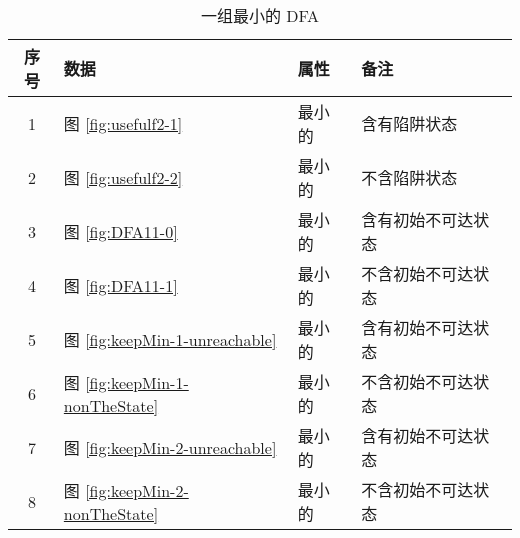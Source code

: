 \begin{table}[!htbp]
    \caption{一组最小的 DFA}
    \label{tab:KeepMinData}
    \centering
    \small%
    \setlength{\tabcolsep}{4pt}%
    \renewcommand{\arraystretch}{1.2}%
    \begin{tabular}{c p{4em}<{\centering} p{4em}<{\centering} l}  %
        \toprule %
                序号  &  数据 & 属性 & 备注 \\
        \midrule%
        1 &  图 \ref{fig:usefulf2-1} & 最小的 & 含有陷阱状态 \\
        2 &  图 \ref{fig:usefulf2-2} & 最小的 & 不含陷阱状态 \\
        \midrule
        3 & 图 \ref{fig:DFA11-0} & 最小的 & 含有初始不可达状态 \\
        4 & 图 \ref{fig:DFA11-1} & 最小的 & 不含初始不可达状态 \\
       \midrule
        5 & 图 \ref{fig:keepMin-1-unreachable} & 最小的 & 含有初始不可达状态 \\
        6 & 图 \ref{fig:keepMin-1-nonTheState} & 最小的 & 不含初始不可达状态 \\
       \midrule
        7 & 图 \ref{fig:keepMin-2-unreachable} & 最小的 & 含有初始不可达状态 \\
        8 & 图 \ref{fig:keepMin-2-nonTheState} & 最小的 & 不含初始不可达状态 \\
        \bottomrule%
    \end{tabular}
\end{table}


